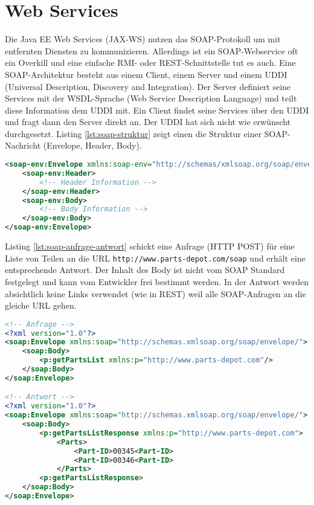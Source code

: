 \chapter{Web Services}

Die Java EE Web Services (JAX-WS) nutzen das SOAP-Protokoll um mit entfernten Diensten zu kommunizieren. Allerdings ist ein SOAP-Webservice oft ein Overkill und eine einfache RMI- oder REST-Schnittstelle tut es auch. Eine SOAP-Architektur besteht aus einem Client, einem Server und einem UDDI (Universal Description, Discovery and Integration). Der Server definiert seine Services mit der WSDL-Sprache (Web Service Description Language) und teilt diese Information dem UDDI mit. Ein Client findet seine Services über den UDDI und fragt dann den Server direkt an. Der UDDI hat sich nicht wie erwünscht durchgesetzt. Listing \ref{lst:soap-struktur} zeigt einen die Struktur einer SOAP-Nachricht (Envelope, Header, Body).

\begin{lstlisting}[language=XML, caption=SOAP Struktur, label=lst:soap-struktur]
<soap-env:Envelope xmlns:soap-env="http://schemas/xmlsoap.org/soap/envelope/">
	<soap-env:Header>
		<!-- Header Information -->
	</soap-env:Header>
	<soap-env:Body>
		<!-- Body Information -->
	</soap-env:Body>
</soap-env:Envelope>
\end{lstlisting}

Listing \ref{lst:soap-anfrage-antwort} schickt eine Anfrage (HTTP POST) für eine Liste von Teilen an die URL \verb|http://www.parts-depot.com/soap| und erhält eine entsprechende Antwort. Der Inhalt des Body ist nicht vom SOAP Standard festgelegt und kann vom Entwickler frei bestimmt werden. In der Antwort werden absichtlich keine Links verwendet (wie in REST) weil alle SOAP-Anfragen an die gleiche URL gehen.

\begin{lstlisting}[language=XML, caption=SOAP Anfrage/Antwort, label=lst:soap-anfrage-antwort]
<!-- Anfrage -->
<?xml version="1.0"?>
<soap:Envelope xmlns:soap="http://schemas.xmlsoap.org/soap/envelope/">
	<soap:Body>
		<p:getPartsList xmlns:p="http://www.parts-depot.com"/>
	</soap:Body>
</soap:Envelope>

<!-- Antwort -->
<?xml version="1.0"?>
<soap:Envelope xmlns:soap="http://schemas.xmlsoap.org/soap/envelope/">
	<soap:Body>
		<p:getPartsListResponse xmlns:p="http://www.parts-depot.com">
			<Parts>
				<Part-ID>00345<Part-ID>
				<Part-ID>00346<Part-ID>
			</Parts>
		<p:getPartsListResponse>
	</soap:Body>
</soap:Envelope>
\end{lstlisting}